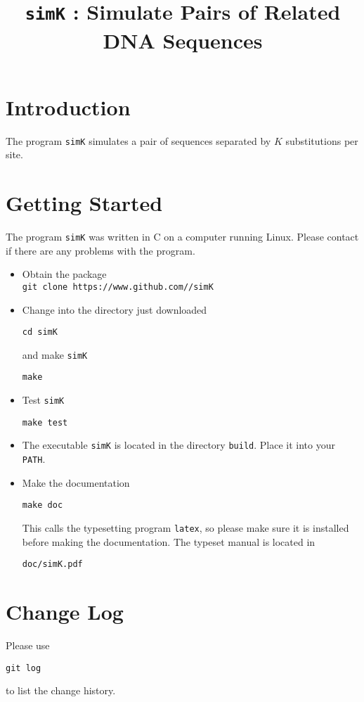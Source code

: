 \documentclass[a4paper, english]{article}
\begin{document}
\title{\texttt{simK} : Simulate Pairs of Related DNA Sequences}
\author{}

\date{}
\maketitle

\section{Introduction}
The program \texttt{simK} simulates a pair of sequences separated by $K$
substitutions per site.

\section{Getting Started}
The program \texttt{simK} was written in C on a computer running Linux.
Please contact \texttt{} if there are any problems
with the program.
\begin{itemize}
\item Obtain the package\\
\texttt{git clone https://www.github.com//simK}
\item Change into the directory just downloaded
\begin{verbatim}
cd simK
\end{verbatim}
and make \texttt{simK}
\begin{verbatim}
make
\end{verbatim}
\item Test \texttt{simK}
\begin{verbatim}
make test
\end{verbatim}
\item The executable \texttt{simK} is located in the
  directory \texttt{build}. Place it into your \texttt{PATH}.
\item Make the documentation
\begin{verbatim}
make doc
\end{verbatim}
This calls the typesetting program \texttt{latex}, so please make sure
it is installed before making the documentation. The typeset manual is
located in
\begin{verbatim}
doc/simK.pdf
\end{verbatim}
\end{itemize}

\section{Change Log}
Please use
\begin{verbatim}
git log
\end{verbatim}
to list the change history.

\end{document}

